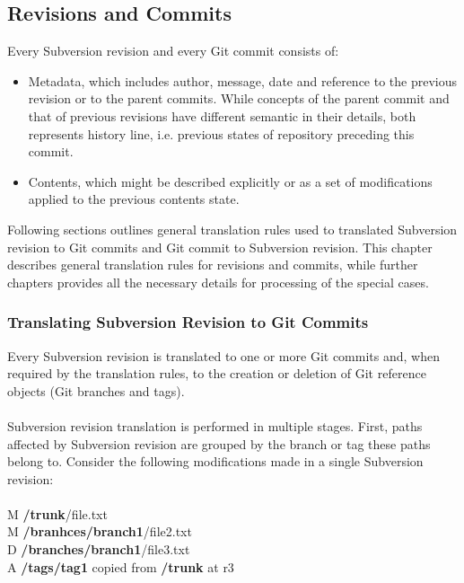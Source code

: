 \subsection{Revisions and Commits}
\label{section_revisions_and_commits}
\renewcommand{\figurename}{Diagram}
Every Subversion revision and every Git commit consists of:
\begin{itemize}
\item Metadata, which includes author, message, date and reference to the previous revision or to the parent commits. While
concepts of the parent commit and that of previous revisions have different semantic in their details, both represents history line, 
i.e. previous states of repository preceding this commit.
\item Contents, which might be described explicitly or as a set of modifications applied to the previous contents state.
\end{itemize}
Following sections outlines general translation rules used to translated Subversion revision to Git commits and Git commit
to Subversion revision. This chapter describes general translation rules for revisions and commits, while further chapters provides all the 
necessary details for processing of the special cases.
\subsubsection{Translating Subversion Revision to Git Commits}
Every Subversion revision is translated to one or more Git commits and,
when required by the translation rules, to the creation or deletion of Git reference objects (Git branches and tags).
\\\\
Subversion revision translation is performed in multiple stages.
First, paths affected by Subversion revision are grouped by the branch or tag these paths belong to. 
Consider the following modifications made in a single Subversion revision:
\\\\
M \textbf{/trunk}/file.txt\\
M \textbf{/branhces/branch1}/file2.txt\\
D \textbf{/branches/branch1}/file3.txt\\
A \textbf{/tags/tag1} copied from \textbf{/trunk} at r3\\

